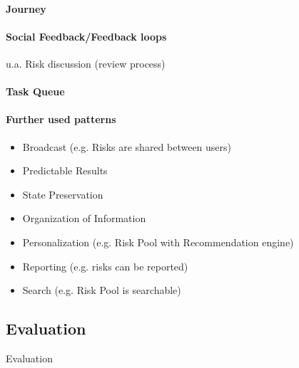 \paragraph*{Journey}

\paragraph*{Social Feedback/Feedback loops}

u.a. Risk discussion (review process)

\paragraph*{Task Queue}

\paragraph*{Further used patterns}

\begin{itemize}
	\item Broadcast (e.g. Risks are shared between users)
	\item Predictable Results
	\item State Preservation
	\item Organization of Information
	\item Personalization (e.g. Risk Pool with Recommendation engine)
	\item Reporting (e.g. risks can be reported)
	\item Search (e.g. Risk Pool is searchable)
\end{itemize}


\subsection{Evaluation}
\label{sec:domainCd}
Evaluation
